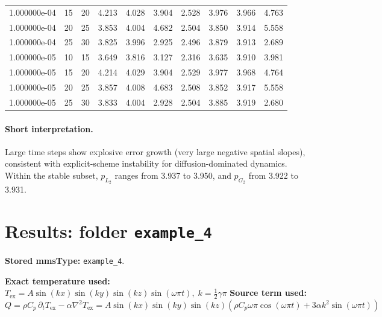 \documentclass[11pt,a4paper]{article}
\begin{document}
\begin{table}[htbp]
{\begin{tabular}{cccccccccc}
1.000000e-04 & 15 & 20 & 4.213 & 4.028 & 3.904 & 2.528 & 3.976 & 3.966 & 4.763 \\
1.000000e-04 & 20 & 25 & 3.853 & 4.004 & 4.682 & 2.504 & 3.850 & 3.914 & 5.558 \\
1.000000e-04 & 25 & 30 & 3.825 & 3.996 & 2.925 & 2.496 & 3.879 & 3.913 & 2.689 \\
1.000000e-05 & 10 & 15 & 3.649 & 3.816 & 3.127 & 2.316 & 3.635 & 3.910 & 3.981 \\
1.000000e-05 & 15 & 20 & 4.214 & 4.029 & 3.904 & 2.529 & 3.977 & 3.968 & 4.764 \\
1.000000e-05 & 20 & 25 & 3.857 & 4.008 & 4.683 & 2.508 & 3.852 & 3.917 & 5.558 \\
1.000000e-05 & 25 & 30 & 3.833 & 4.004 & 2.928 & 2.504 & 3.885 & 3.919 & 2.680 \\
\bottomrule
\end{tabular}%
}
\end{table}
\paragraph{Short interpretation.}
Large time steps show explosive error growth (very large negative spatial slopes), consistent with explicit-scheme instability for diffusion-dominated dynamics. Within the stable subset, $p_{L_2}$ ranges from 3.937 to 3.950, and $p_{G_2}$ from 3.922 to 3.931.
\section{Results: folder \texttt{example\_4}}
\textbf{Stored mmsType:} \texttt{example\_4}.

\textbf{Exact temperature used:} $T_{\mathrm{ex}} = A\sin(kx)\sin(ky)\sin(kz)\sin(\omega\pi t),\; k=\tfrac{1}{2}\gamma\pi$
\textbf{Source term used:} $Q = \rho C_p\,\partial_t T_{\mathrm{ex}} - \alpha\nabla^2 T_{\mathrm{ex}} = A\sin(kx)\sin(ky)\sin(kz)\left(\rho C_p\omega\pi\cos(\omega\pi t) + 3\alpha k^2\sin(\omega\pi t)\right)$
\end{document}

